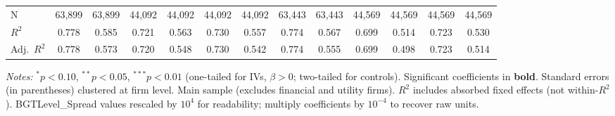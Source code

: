 \documentclass[11pt,a4paper]{article}
\begin{document}
\begin{table}[htbp]
\begin{tabular}{lcccccccccccc}
\midrule
N & 63,899 & 63,899 & 44,092 & 44,092 & 44,092 & 44,092 & 63,443 & 63,443 & 44,569 & 44,569 & 44,569 & 44,569 \\
$R^2$ & 0.778 & 0.585 & 0.721 & 0.563 & 0.730 & 0.557 & 0.774 & 0.567 & 0.699 & 0.514 & 0.723 & 0.530 \\
Adj.~$R^2$ & 0.778 & 0.573 & 0.720 & 0.548 & 0.730 & 0.542 & 0.774 & 0.555 & 0.699 & 0.498 & 0.723 & 0.514 \\
\bottomrule
\end{tabular}
\begin{minipage}{\linewidth}
\vspace{2pt}\scriptsize
\textit{Notes:} $^{*}p<0.10$, $^{**}p<0.05$, $^{***}p<0.01$ (one-tailed for IVs, $\beta > 0$; two-tailed for controls).
 Significant coefficients in \textbf{bold}.
 Standard errors (in parentheses) clustered at firm level.
 Main sample (excludes financial and utility firms).
 $R^2$ includes absorbed fixed effects (not within-$R^2$).
 BGTLevel\_Spread values rescaled by $10^4$ for readability; multiply coefficients by $10^{-4}$ to recover raw units.
\end{minipage}
\end{table}
\clearpage
\end{document}
